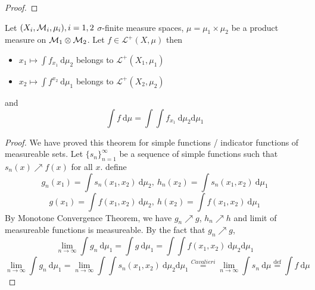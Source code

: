 \begin{proof}
\end{proof}

\begin{theorem}
  Let $(X_i, \mathcal M_i, \mu_i), i=1,2$ $\sigma$-finite measure spaces, $\mu = \mu_1 \times \mu_2$ be a product measure on $\mathcal M_1 \otimes \mathcal M_2$. 
  Let $f \in \mathcal{L}^+(X, \mu)$ then 
  \begin{itemize}
    \item $x_1 \mapsto \int f_{x_1} \ \mathrm{d}\mu_2$ belongs to $\mathcal{L}^+(X_1, \mu_1)$
    \item $x_2 \mapsto \int f^{x_2} \ \mathrm{d}\mu_1$ belongs to $\mathcal{L}^+(X_2, \mu_2)$
  \end{itemize}
  and 
  \[\int f \ \mathrm{d}\mu = \int \int f_{x_1} \ \mathrm{d}\mu_2 \mathrm{d}\mu_1\]
\end{theorem}

\begin{proof}
  We have proved this theorem for simple functions / indicator functions of measureable sets.
  Let $\{s_n\}_{n=1}^\infty$ be a sequence of simple functions such that $s_n(x) \nearrow f(x)$ for all $x$. 
  define 
  \[g_n(x_1) = \int s_n(x_1, x_2) \ \mathrm{d}\mu_2,\ h_n(x_2) = \int s_n(x_1, x_2) \ \mathrm{d}\mu_1\]
  \[g(x_1) = \int f(x_1, x_2) \ \mathrm{d}\mu_2,\ h(x_2) = \int f(x_1, x_2) \ \mathrm{d}\mu_1\]
  By Monotone Convergence Theorem, we have $g_n \nearrow g$, $h_n \nearrow h$ and limit of measureable functions is measureable.
  By the fact that $g_n \nearrow g$, 
  \[\lim_{n\to\infty}\int g_n \ \mathrm{d}\mu_1 = \int g \ \mathrm{d}\mu_1 = \int \int f(x_1, x_2) \ \mathrm{d}\mu_2 \mathrm{d}\mu_1 \]
  \[\lim_{n\to\infty}\int g_n \ \mathrm{d}\mu_1 = \lim_{n\to\infty} \int\int s_n(x_1, x_2) \ \mathrm{d}\mu_2 \mathrm{d}\mu_1 \overset{Cavalieri}= \lim_{n\to\infty} \int s_n \ \mathrm{d}\mu \overset{\text{def}}= \int f \ \mathrm{d}\mu\]
\end{proof}


